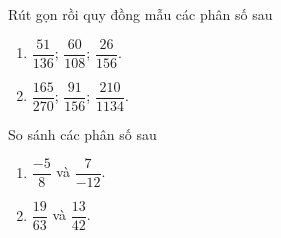 \begin{bt}%
	Rút gọn rồi quy đồng mẫu các phân số sau
	\begin{multicols}{2}
		\begin{enumerate}
			\item $ \dfrac{51}{136} $; $ \dfrac{60}{108} $; $ \dfrac{26}{156} $.
			\item $ \dfrac{165}{270} $; $ \dfrac{91}{156} $; $ \dfrac{210}{1134} $.
		\end{enumerate}
	\end{multicols}
\end{bt}
\begin{bt}%
	So sánh các phân số sau
	\begin{multicols}{2}
		\begin{enumerate}
			\item $ \dfrac{-5}{8} $ và $ \dfrac{7}{-12} $.
			\item $ \dfrac{19}{63} $ và $ \dfrac{13}{42} $.
		\end{enumerate}
	\end{multicols}
\end{bt}
